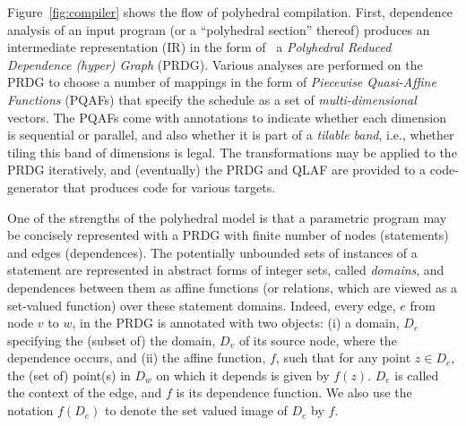 Figure~\ref{fig:compiler} shows the flow of polyhedral compilation.  First,
dependence analysis of an input program (or a ``polyhedral section'' thereof)
produces an intermediate representation (IR) in the form of~\cite{DRV-sched00}
a \emph{Polyhedral Reduced Dependence (hyper) Graph} (PRDG).  Various analyses
are performed on the PRDG to choose a number of mappings in the form of
\emph{Piecewise Quasi-Affine Functions} (PQAFs) that specify the schedule as a
set of \emph{multi-dimensional} vectors.  The PQAFs come with annotations to
indicate whether each dimension is sequential or parallel, and also whether it
is part of a \emph{tilable band}, i.e., whether tiling this band of dimensions
is legal.  The transformations may be applied to the PRDG iteratively, and
(eventually) the PRDG and QLAF are provided to a code-generator that produces
code for various targets.


One of the strengths of the polyhedral model is that a parametric program may
be concisely represented with a PRDG with finite number of nodes (statements)
and edges (dependences).  The potentially unbounded sets of instances of a
statement are represented in abstract forms of integer sets, called
\emph{domains}, and dependences between them as affine functions (or
relations, which are viewed as a set-valued function) over these statement
domains.  Indeed, every edge, $e$ from node $v$ to $w$, in the PRDG is
annotated with two objects: (i) a domain, $D_e$ specifying the (subset of) the
domain, $D_v$ of its source node, where the dependence occurs, and (ii) the
affine function, $f$, such that for any point $z\in D_e$, the (set of)
point(s) in $D_w$ on which it depends is given by $f(z)$.  $D_e$ is called the
context of the edge, and $f$ is its dependence function.  We also use the
notation $f(D_e)$ to denote the set valued image of $D_e$ by $f$.

